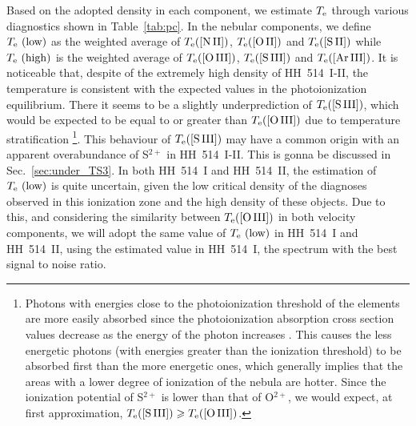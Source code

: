 \documentclass[fleqn,usenatbib]{mnras}
\begin{document}
Based on the adopted density in each component, we estimate $T_{\rm e}$ through various diagnostics shown in Table~\ref{tab:pc}. In the nebular components, we define $T_{\rm e} \text{ (low)}$ as the weighted average of $T_{\rm e} (\text{[N\thinspace II]})$, $T_{\rm e} (\text{[O\thinspace II]})$ and $T_{\rm e} (\text{[S\thinspace II]})$ while $T_{\rm e} \text{ (high)}$ is the weighted average of $T_{\rm e} (\text{[O\thinspace III]})$, $T_{\rm e} (\text{[S\thinspace III]})$ and $T_{\rm e} (\text{[Ar\thinspace III]})$. It is noticeable that, despite of the extremely high density of HH~514~I-II, the temperature is consistent with the expected values in the photoionization equilibrium. There it seems to be a slightly underprediction of $T_{\rm e}(\text{[S\thinspace III]})$, which would be expected to be equal to or greater than $T_{\rm e}(\text{[O\thinspace III]})$ due to temperature stratification \footnote{Photons with energies close to the photoionization threshold of the elements are more easily absorbed since the photoionization absorption cross section values decrease as the energy of the photon increases \citep{osterbrock06}. This causes the less energetic photons (with energies greater than the ionization threshold) to be absorbed first than the more energetic ones, which generally implies that the areas with a lower degree of ionization of the nebula are hotter. Since the ionization potential of S$^{2+}$ is lower than that of O$^{2+}$, we would expect, at first approximation, $T_{\rm e}(\text{[S\thinspace III]})\geq T_{\rm e}(\text{[O\thinspace III]})$.}. This behaviour of $T_{\rm e}(\text{[S\thinspace III]})$ may have a common origin with an apparent overabundance of S$^{2+}$ in HH~514~I-II. This is gonna be discussed in Sec.~\ref{sec:under_TS3}. In both HH~514~I and HH~514~II, the estimation of $T_{\rm e} \text{ (low)}$ is quite uncertain, given the low critical density of the diagnoses observed in this ionization zone and the high density of these objects. Due to this, and considering the similarity between $T_{\rm e}(\text{[O\thinspace III]})$ in both velocity components, we will adopt the same value of $T_{\rm e} \text{ (low)}$ in HH~514~I and HH~514~II, using the estimated value in HH~514~I, the spectrum with the best signal to noise ratio.
\end{document}
